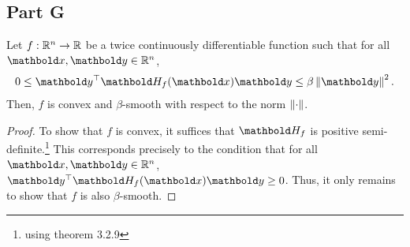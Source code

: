 \documentclass{tufte-handout}
\begin{document}
\subsection{Part G}
\begin{lem}\label{lem:part:2g}
Let $f : \mathbb{R}^n \to \mathbb{R}$ be a twice continuously differentiable function such that for all $\vx, \vy \in \R^n$, \begin{align}
    0 \leq \trans{\vy}\mH_f(\vx) \vy \leq \beta \norm{\vy}^2.
\end{align} Then, $f$ is convex and $\beta$-smooth with respect to the norm $\left\| \cdot \right\|$.
\end{lem}
\begin{proof} To show that $f$ is convex, it suffices that $\mH_f$ is positive semi-definite.\footnote{using theorem 3.2.9} This corresponds precisely to the condition that for all $\vx, \vy \in \R^n$, $\trans{\vy}\mH_f(\vx) \vy \geq 0$. Thus, it only remains to show that $f$ is also $\beta$-smooth.


\end{proof}
\end{document}
